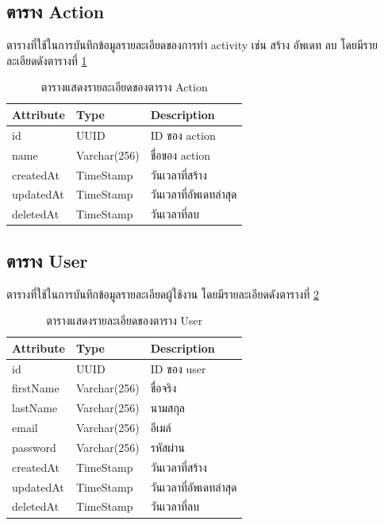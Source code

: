 \documentclass[12pt,oneside,openright,a4paper]{cpe-thai-project}
\begin{document}
\subsection{ตาราง Action}
ตารางที่ใช้ในการบันทึกข้อมูลรายละเอียดของการทำ activity เช่น สร้าง อัพเดท ลบ โดยมีรายละเอียดดังตารางที่ \ref{tbl:dbAction}
\begin{table}[!h]
    \centering
    \begin{tabular}{|l|l|l|}
    \hline
    \textbf{Attribute} & \textbf{Type} & \textbf{Description}   \\ \hline
    id        & UUID        & ID ของ action          \\ \hline
    name      & Varchar(256) & ชื่อของ action         \\ \hline
    createdAt & TimeStamp   & วันเวลาที่สร้าง        \\ \hline
    updatedAt & TimeStamp   & วันเวลาที่อัพเดทล่าสุด \\ \hline
    deletedAt & TimeStamp   & วันเวลาที่ลบ          \\ \hline    
    \end{tabular}
    \caption{\centering  ตารางแสดงรายละเอียดของตาราง Action} \label{tbl:dbAction}
\end{table}


\subsection{ตาราง User}
ตารางที่ใช้ในการบันทึกข้อมูลรายละเอียดผู้ใช้งาน โดยมีรายละเอียดดังตารางที่ \ref{tbl:dbUser}
\begin{table}[!h]
    \centering
    \begin{tabular}{|l|l|l|}
    \hline
    \textbf{Attribute} & \textbf{Type} & \textbf{Description}   \\ \hline
    id        & UUID        & ID ของ user            \\ \hline
    firstName & Varchar(256) & ชื่อจริง               \\ \hline
    lastName  & Varchar(256) & นามสกุล                \\ \hline
    email     & Varchar(256) & อีเมล์                 \\ \hline
    password  & Varchar(256) & รหัสผ่าน               \\ \hline
    createdAt & TimeStamp   & วันเวลาที่สร้าง        \\ \hline
    updatedAt & TimeStamp   & วันเวลาที่อัพเดทล่าสุด \\ \hline
    deletedAt & TimeStamp   & วันเวลาที่ลบ                \\ \hline
    \end{tabular}
    \caption{\centering  ตารางแสดงรายละเอียดของตาราง User} \label{tbl:dbUser}
\end{table}
\end{document}
